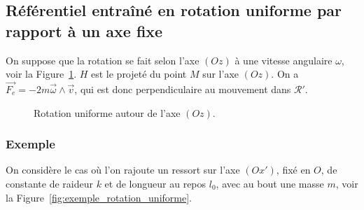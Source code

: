     \subsection[Référentiel entraîné en rotation uniforme]{Référentiel entraîné en rotation uniforme par\\rapport à un axe fixe}

        On suppose que la rotation se fait selon l'axe $(Oz)$ à une vitesse angulaire $\omega$, voir la Figure~\ref{fig:rotation_uniforme}. $H$ est le projeté du point $M$ sur l'axe $(Oz)$. On a $\vec{F_e}=-2m\vec{\omega}\wedge\vec{v}$, qui est donc perpendiculaire au mouvement dans $\mathcal{R}'$.

        \begin{figure}
            \centering
            \caption{Rotation uniforme autour de l'axe $(Oz)$.}    
            \label{fig:rotation_uniforme}
        \end{figure}

        \subsubsection{Exemple}

            On considère le cas où l'on rajoute un ressort sur l'axe $(Ox')$, fixé en $O$, de constante de raideur $k$ et de longueur au repos $l_0$, avec au bout une masse $m$, voir la Figure~\ref{fig:exemple_rotation_uniforme}.           

